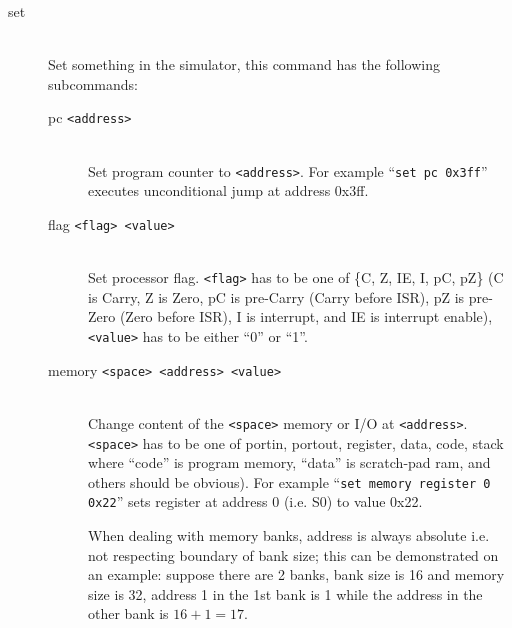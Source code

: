         \begin{description}
            \item[set]~\\
                Set something in the simulator, this command has the following subcommands:
                \begin{description}
                    \item[pc \texttt{<address>}]~\\
                        Set program counter to \texttt{<address>}. For example ``\texttt{set pc 0x3ff}'' executes unconditional jump at address 0x3ff.
                    \item[flag \texttt{<flag> <value>}]~\\
                        Set processor flag. \texttt{<flag>} has to be one of \{C, Z, IE, I, pC, pZ\} (C is Carry, Z is Zero, pC is pre-Carry (Carry before ISR), pZ is pre-Zero (Zero before ISR), I is interrupt, and IE is interrupt enable), \texttt{<value>} has to be either ``0'' or ``1''.
                    \item[memory \texttt{<space> <address> <value>}]~\\
                        Change content of the \texttt{<space>} memory or I/O at \texttt{<address>}. \texttt{<space>} has to be one of { portin, portout, register, data, code, stack} where ``code'' is program memory, ``data'' is scratch-pad ram, and others should be obvious). For example ``\texttt{set memory register 0 0x22}''  sets register at address 0 (i.e. S0) to value 0x22.

                        When dealing with memory banks, address is always absolute i.e. not respecting boundary of bank size; this can be demonstrated on an example: suppose there are 2 banks, bank size is 16 and memory size is 32, address 1 in the 1st bank is 1 while the address in the other bank is $16+1=17$.


\end{description}
\end{description}
